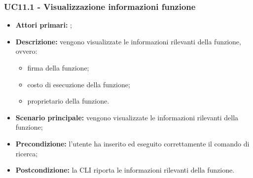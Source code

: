 \subsubsection{UC11.1 - Visualizzazione informazioni funzione }
\begin{itemize}
	\item \textbf{Attori primari:} \ua{};
	\item \textbf{Descrizione:} vengono visualizzate le informazioni rilevanti della funzione, ovvero:
	\begin{itemize}
		\item firma della funzione;
		\item costo di esecuzione della funzione;
		\item proprietario della funzione.
	\end{itemize}
	\item \textbf{Scenario principale:} vengono visualizzate le informazioni rilevanti della funzione; 
	\item \textbf{Precondizione:} l’utente ha inserito ed eseguito correttamente il comando di ricerca;  
	\item \textbf{Postcondizione:} la CLI riporta le informazioni rilevanti della funzione.
\end{itemize}